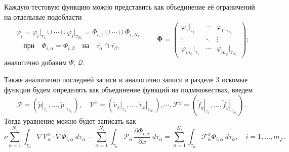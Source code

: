\documentclass[a4paper,14pt]{extarticle}
\begin{document}
	Каждую  тестовую функцию можно представить как объединение её ограничений на отдельные подобласти
	\begin{equation}
	\begin{gathered}
		\varphi_i =
		\varphi_i\big|_{\tau_1}
		\cup
		\cdots 
		\cup
		\varphi_i\big|_{\tau_{N_\tau}}
		=
		\Phi_{i,1}
		\cup
		\cdots 
		\cup
		\Phi_{i,N_\tau}		\\
		\quad
		\text{при}
		\quad
		\Phi_{i,\alpha}
		=
		\Phi_{i,\beta}
		\quad
		\text{на}
		\quad
		\overline{\tau_\alpha}\cap\overline{\tau_\beta},
	\end{gathered}
	\qquad
		\boldsymbol{\Phi}=
		\begin{pmatrix}
			\varphi_1\big|_{\tau_1}&  \cdots & \varphi_1\big|_{\tau_{N_\tau}} \\
			\vdots & \ddots &  \vdots\\
			\varphi_{m_\varphi}\big|_{\tau_1} & \cdots & \varphi_{m_\varphi}\big|_{\tau_{N_\tau}}
		\end{pmatrix};
	\end{equation}
	аналогично добавим $\Psi$, $\mathcal{Q}$.
	
	Также аналогично последней записи и аналогично записи в разделе 3 искомые функции будем определять как объединение функций на подмножествах, введем
	\begin{equation}
		\mathcal{P} =
		\left(
		\left.\widetilde{p}\right|_{\tau_1},
		\ldots,
		\left.\widetilde{p}\right|_{\tau_{N_\tau}}
		\right),
		\quad
		\mathcal{V}^x =
		\left(
		\left.\widetilde{v}_x\right|_{\tau_1},
		\ldots,
		\left.\widetilde{v}_x\right|_{\tau_{N_\tau}}
		\right),
		\cdots,
		\mathcal{F}^y =
		\left(
		\left.\widetilde{f}_y\right|_{\tau_1},
		\ldots,
		\left.\widetilde{f}_y\right|_{\tau_{N_\tau}}
		\right).
	\end{equation}
	Тогда уравнение можно будет записать как
	\begin{equation}
		\nu \sum_{\alpha=1}^{N_{\tau}} \int_{\tau_\alpha}
		\nabla \mathcal{V}_{\alpha}^{x}  \cdot\nabla \Phi_{i,\alpha}  ~ d\tau_\alpha 
		-
		\sum_{\alpha=1}^{N_{\tau}} \int_{\tau_\alpha}
		\mathcal{P}_{\alpha}\,\frac{\partial \Phi_{i,\alpha}}{\partial x} ~ d\tau_\alpha
		=
		\sum_{\alpha=1}^{N_{\tau}} \int_{\tau_\alpha}
		\mathcal{F}^{x}_{\alpha} \Phi_{i,\alpha} ~ d\tau_\alpha,
		\quad
		i=1,\ldots,m_\varphi.		
	\end{equation}

	
\end{document}

